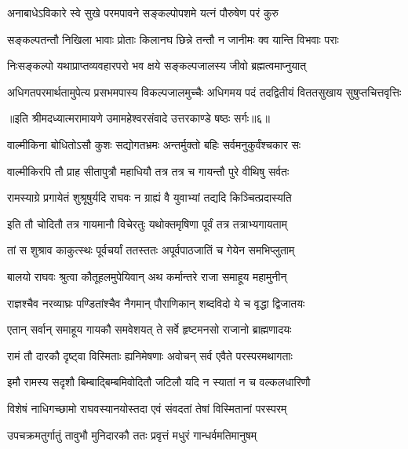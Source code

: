 \twolineshloka
{अनाबाधेऽविकारे स्वे सुखे परमपावने}
{सङ्कल्पोपशमे यत्नं पौरुषेण परं कुरु} %

\twolineshloka
{सङ्कल्पतन्तौ निखिला भावाः प्रोताः किलानघ}
{छिन्ने तन्तौ न जानीमः क्व यान्ति विभवाः पराः} %

\twolineshloka
{निःसङ्कल्पो यथाप्राप्तव्यवहारपरो भव}
{क्षये सङ्कल्पजालस्य जीवो ब्रह्मत्वमाप्नुयात्} %

\twolineshloka
{अधिगतपरमार्थतामुपेत्य प्रसभमपास्य विकल्पजालमुच्चैः}
{अधिगमय पदं तदद्वितीयं विततसुखाय सुषुप्तचित्तवृत्तिः} %

{॥इति श्रीमदध्यात्मरामायणे उमामहेश्वरसंवादे उत्तरकाण्डे षष्ठः
सर्गः॥६॥
}





\twolineshloka
{वाल्मीकिना बोधितोऽसौ कुशः सद्योगतभ्रमः}
{अन्तर्मुक्तो बहिः सर्वमनुकुर्वंश्चकार सः} %

\twolineshloka
{वाल्मीकिरपि तौ प्राह सीतापुत्रौ महाधियौ}
{तत्र तत्र च गायन्तौ पुरे वीथिषु सर्वतः} %

\twolineshloka
{रामस्याग्रे प्रगायेतं शुश्रूषुर्यदि राघवः}
{न ग्राह्यं वै युवाभ्यां तद्यदि किञ्चित्प्रदास्यति} %

\twolineshloka
{इति तौ चोदितौ तत्र गायमानौ विचेरतुः}
{यथोक्तमृषिणा पूर्वं तत्र तत्राभ्यगायताम्} %

\twolineshloka
{तां स शुश्राव काकुत्स्थः पूर्वचर्यां ततस्ततः}
{अपूर्वपाठजातिं च गेयेन समभिप्लुताम्} %

\twolineshloka
{बालयो राघवः श्रुत्वा कौतूहलमुपेयिवान्}
{अथ कर्मान्तरे राजा समाहूय महामुनीन्} %

\twolineshloka
{राज्ञश्चैव नरव्याघ्रः पण्डितांश्चैव नैगमान्}
{पौराणिकान् शब्दविदो ये च वृद्धा द्विजातयः} %

\twolineshloka
{एतान् सर्वान् समाहूय गायकौ समवेशयत्}
{ते सर्वे हृष्टमनसो राजानो ब्राह्मणादयः} %

\twolineshloka
{रामं तौ दारकौ दृष्ट्वा विस्मिताः ह्यनिमेषणाः}
{अवोचन् सर्व एवैते परस्परमथागताः} %

\twolineshloka
{इमौ रामस्य सदृशौ बिम्बाद्बिम्बमिवोदितौ}
{जटिलौ यदि न स्यातां न च वल्कलधारिणौ} %

\twolineshloka
{विशेषं नाधिगच्छामो राघवस्यानयोस्तदा}
{एवं संवदतां तेषां विस्मितानां परस्परम्} %

\twolineshloka
{उपचक्रमतुर्गातुं तावुभौ मुनिदारकौ}
{ततः प्रवृत्तं मधुरं गान्धर्वमतिमानुषम्} %

